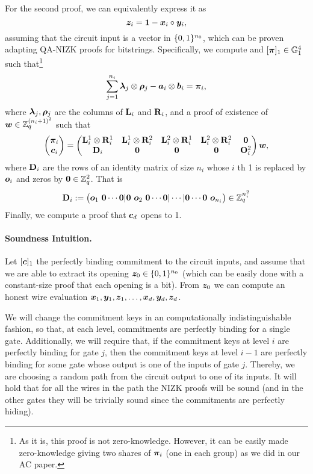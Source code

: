 For the second proof, we can equivalently express it as
$$
{\boldsymbol{z}}_i = {\boldsymbol{1}} - {\boldsymbol{x}}_i\circ{\boldsymbol{y}}_i,
$$
assuming that the circuit input is a vector in $\{0,1\}^{n_0}$, which can be proven adapting QA-NIZK proofs for bitstrings. Specifically, we compute and $[{\boldsymbol{\pi}}]_1\in\mathbb{G}_1^4$ such that\footnote{As it is, this proof is not zero-knowledge. However, it can be easily made zero-knowledge giving two shares  of ${\boldsymbol{\pi}}_i$ (one in each group) as we did in our AC paper.}
$$
\sum_{j=1}^{n_i} {\boldsymbol{\lambda}}_j\otimes {\boldsymbol{\rho}}_j-{\boldsymbol{a}}_i\otimes{\boldsymbol{b}}_i = {\boldsymbol{\pi}}_i,$$  where ${\boldsymbol{\lambda}}_j,{\boldsymbol{\rho}}_j$ are the columns of $\mathbf{{L}}_i$ and $\mathbf{{R}}_i$, and a proof of existence of ${\boldsymbol{w}}\in\mathbb{Z}_q^{(n_i+1)^2}$ such that
$$
\begin{pmatrix}
{\boldsymbol{\pi}}_i \\ {\boldsymbol{c}}_i
\end{pmatrix}
=
\begin{pmatrix}
\mathbf{{L}}^1_i\otimes\mathbf{{R}}^1_i & \mathbf{{L}}^1_i\otimes\mathbf{{R}}^2_i & \mathbf{{L}}^2_i\otimes\mathbf{{R}}^1_i & \mathbf{{L}}^2_i\otimes\mathbf{{R}}^2_i  & {\boldsymbol{0 }}\\
\mathbf{{D}}_i                  & {\boldsymbol{0}}                                       & {\boldsymbol{0}}                                       & {\boldsymbol{0}}
                                   & \mathbf{{O}}^2_i   
\end{pmatrix}
{\boldsymbol{w}},
$$
where $\mathbf{{D}}_i$ are the rows of an identity matrix of size $n_i$ whose $i$ th 1 is replaced by ${\boldsymbol{o}}_i$ and zeros by ${\boldsymbol{0}}\in\mathbb{Z}_q^2$. That is
$$
\mathbf{{D}}_i := 
\begin{pmatrix}
	{\boldsymbol{o}}_1\ {\boldsymbol{0}}\cdots{\boldsymbol{0}} |
	{\boldsymbol{0}}\ {\boldsymbol{o}}_2\ {\boldsymbol{0}}\cdots{\boldsymbol{0}} |
	\cdots |
	{\boldsymbol{0}}\cdots{\boldsymbol{0}}\ {\boldsymbol{o}}_{n_i}
\end{pmatrix}
\in\mathbb{Z}_q^{n_i^2}
$$
Finally, we compute a proof that ${\boldsymbol{c}}_d$ opens to 1.
\paragraph{Soundness Intuition.} Let $[{\boldsymbol{c}}]_1$ the perfectly binding commitment to the circuit inputs, and assume that we are able to extract its opening ${\boldsymbol{z}}_0\in\{0,1\}^{n_0}$ (which can be easily done with a constant-size proof that each opening is a bit). From ${\boldsymbol{z}}_0$ we can compute an honest wire evaluation ${\boldsymbol{x}}_1,{\boldsymbol{y}}_1,{\boldsymbol{z}}_1,\ldots,{\boldsymbol{x}}_d,{\boldsymbol{y}}_d,{\boldsymbol{z}}_d$.

We will change the commitment keys in an computationally indistinguishable fashion, so that, at each level, commitments are perfectly binding for a single gate. Additionally, we will require that, if the commitment keys at level $i$ are perfectly binding for gate $j$, then the commitment keys at level $i-1$ are perfectly binding for some gate whose output is one of the inputs of gate $j$. Thereby, we are choosing a random path from the circuit output to one of its inputs. It will hold that for all the wires in the path the NIZK proofs will be sound (and in the other gates they will be trivially sound since the commitments are perfectly hiding).

